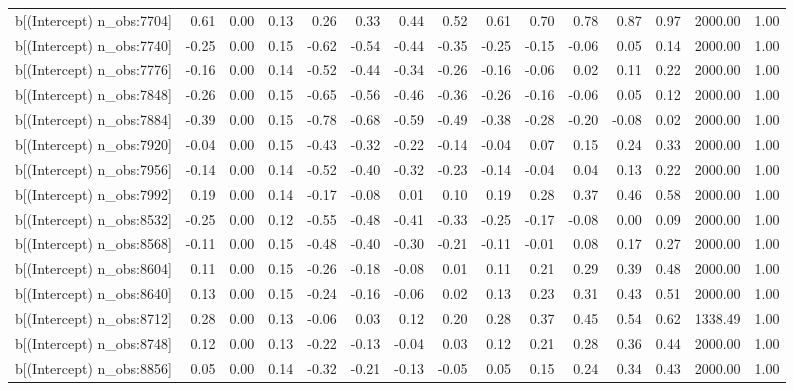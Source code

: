 \begin{table}[ht]
\begin{tabular}{rrrrrrrrrrrrrrr}
  b[(Intercept) n\_obs:7704] & 0.61 & 0.00 & 0.13 & 0.26 & 0.33 & 0.44 & 0.52 & 0.61 & 0.70 & 0.78 & 0.87 & 0.97 & 2000.00 & 1.00 \\ 
  b[(Intercept) n\_obs:7740] & -0.25 & 0.00 & 0.15 & -0.62 & -0.54 & -0.44 & -0.35 & -0.25 & -0.15 & -0.06 & 0.05 & 0.14 & 2000.00 & 1.00 \\ 
  b[(Intercept) n\_obs:7776] & -0.16 & 0.00 & 0.14 & -0.52 & -0.44 & -0.34 & -0.26 & -0.16 & -0.06 & 0.02 & 0.11 & 0.22 & 2000.00 & 1.00 \\ 
  b[(Intercept) n\_obs:7848] & -0.26 & 0.00 & 0.15 & -0.65 & -0.56 & -0.46 & -0.36 & -0.26 & -0.16 & -0.06 & 0.05 & 0.12 & 2000.00 & 1.00 \\ 
  b[(Intercept) n\_obs:7884] & -0.39 & 0.00 & 0.15 & -0.78 & -0.68 & -0.59 & -0.49 & -0.38 & -0.28 & -0.20 & -0.08 & 0.02 & 2000.00 & 1.00 \\ 
  b[(Intercept) n\_obs:7920] & -0.04 & 0.00 & 0.15 & -0.43 & -0.32 & -0.22 & -0.14 & -0.04 & 0.07 & 0.15 & 0.24 & 0.33 & 2000.00 & 1.00 \\ 
  b[(Intercept) n\_obs:7956] & -0.14 & 0.00 & 0.14 & -0.52 & -0.40 & -0.32 & -0.23 & -0.14 & -0.04 & 0.04 & 0.13 & 0.22 & 2000.00 & 1.00 \\ 
  b[(Intercept) n\_obs:7992] & 0.19 & 0.00 & 0.14 & -0.17 & -0.08 & 0.01 & 0.10 & 0.19 & 0.28 & 0.37 & 0.46 & 0.58 & 2000.00 & 1.00 \\ 
  b[(Intercept) n\_obs:8532] & -0.25 & 0.00 & 0.12 & -0.55 & -0.48 & -0.41 & -0.33 & -0.25 & -0.17 & -0.08 & 0.00 & 0.09 & 2000.00 & 1.00 \\ 
  b[(Intercept) n\_obs:8568] & -0.11 & 0.00 & 0.15 & -0.48 & -0.40 & -0.30 & -0.21 & -0.11 & -0.01 & 0.08 & 0.17 & 0.27 & 2000.00 & 1.00 \\ 
  b[(Intercept) n\_obs:8604] & 0.11 & 0.00 & 0.15 & -0.26 & -0.18 & -0.08 & 0.01 & 0.11 & 0.21 & 0.29 & 0.39 & 0.48 & 2000.00 & 1.00 \\ 
  b[(Intercept) n\_obs:8640] & 0.13 & 0.00 & 0.15 & -0.24 & -0.16 & -0.06 & 0.02 & 0.13 & 0.23 & 0.31 & 0.43 & 0.51 & 2000.00 & 1.00 \\ 
  b[(Intercept) n\_obs:8712] & 0.28 & 0.00 & 0.13 & -0.06 & 0.03 & 0.12 & 0.20 & 0.28 & 0.37 & 0.45 & 0.54 & 0.62 & 1338.49 & 1.00 \\ 
  b[(Intercept) n\_obs:8748] & 0.12 & 0.00 & 0.13 & -0.22 & -0.13 & -0.04 & 0.03 & 0.12 & 0.21 & 0.28 & 0.36 & 0.44 & 2000.00 & 1.00 \\ 
  b[(Intercept) n\_obs:8856] & 0.05 & 0.00 & 0.14 & -0.32 & -0.21 & -0.13 & -0.05 & 0.05 & 0.15 & 0.24 & 0.34 & 0.43 & 2000.00 & 1.00 \\ 

\end{tabular}
\end{table}
